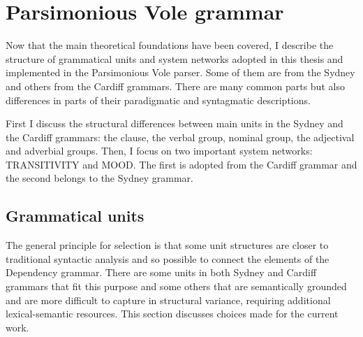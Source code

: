 \chapter{Parsimonious Vole grammar}
\label{ch:the-grammar}
    
    Now that the main theoretical foundations have been covered, I describe the structure of grammatical units and system networks adopted in this thesis and implemented in the Parsimonious Vole parser. Some of them are from the Sydney and others from the Cardiff grammars. There are many common parts but also differences in parts of their paradigmatic and syntagmatic descriptions. %
    
    First I discuss the structural differences between main units in the Sydney and the Cardiff grammars: the clause, the verbal group, nominal group, the adjectival and adverbial groups. Then, I focus on two important system networks: TRANSITIVITY  and MOOD. The first is adopted from the Cardiff grammar and the second belongs to the Sydney grammar.

\section{Grammatical units}
\label{sec:discussion-unit-classes}
    
    The general principle for selection is that some unit structures are closer to traditional syntactic analysis and so possible to connect the elements of the Dependency grammar. There are some units in both Sydney and Cardiff grammars that fit this purpose and some others that are semantically grounded and are more difficult to capture in structural variance, requiring additional lexical-semantic resources. This section discusses choices made for the current work.
    

